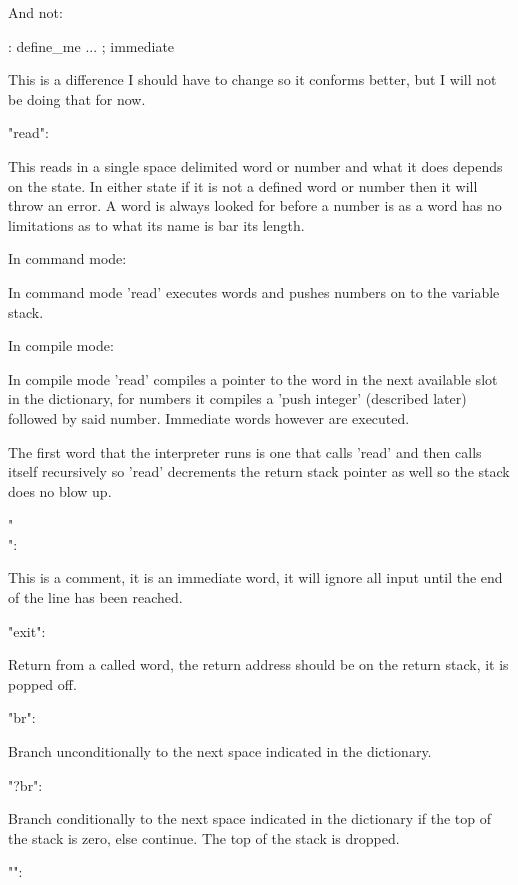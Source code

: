 And not\-: \begin{DoxyVerb}: define_me ... ; immediate
\end{DoxyVerb}


This is a difference I should have to change so it conforms better, but I will not be doing that for now. \begin{DoxyVerb}   "read":
\end{DoxyVerb}


This reads in a single space delimited word or number and what it does depends on the state. In either state if it is not a defined word or number then it will throw an error. A word is always looked for before a number is as a word has no limitations as to what its name is bar its length.

In command mode\-:

In command mode 'read' executes words and pushes numbers on to the variable stack.

In compile mode\-:

In compile mode 'read' compiles a pointer to the word in the next available slot in the dictionary, for numbers it compiles a 'push integer' (described later) followed by said number. Immediate words however are executed.

The first word that the interpreter runs is one that calls 'read' and then calls itself recursively so 'read' decrements the return stack pointer as well so the stack does no blow up. \begin{DoxyVerb}   "\\":
\end{DoxyVerb}


This is a comment, it is an immediate word, it will ignore all input until the end of the line has been reached. \begin{DoxyVerb}   "exit":
\end{DoxyVerb}


Return from a called word, the return address should be on the return stack, it is popped off. \begin{DoxyVerb}   "br":
\end{DoxyVerb}


Branch unconditionally to the next space indicated in the dictionary. \begin{DoxyVerb}   "?br":
\end{DoxyVerb}


Branch conditionally to the next space indicated in the dictionary if the top of the stack is zero, else continue. The top of the stack is dropped. \begin{DoxyVerb}   "\+":
\end{DoxyVerb}


